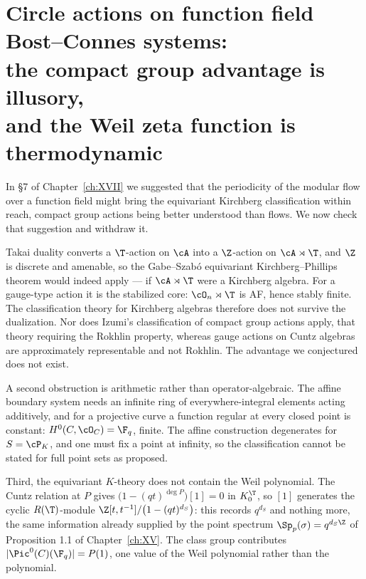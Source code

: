 \chapter[The compact group advantage is illusory]{Circle actions on function field Bost--Connes systems:\\ the compact group advantage is illusory,\\ and the Weil zeta function is thermodynamic}\label{ch:XVIII}
\begin{summary}
In \S7 of Chapter~\ref{ch:XVII} we suggested that the periodicity of the modular flow over a function
field might bring the equivariant Kirchberg classification within reach, compact group actions
being better understood than flows. We now check that suggestion and withdraw it.

Takai duality converts a $\T$-action on $\cA$ into a $\Z$-action on $\cA\rtimes\T$, and $\Z$
is discrete and amenable, so the Gabe--Szab\'o equivariant Kirchberg--Phillips theorem would
indeed apply --- if $\cA\rtimes\T$ were a Kirchberg algebra. For a gauge-type action it is
the stabilized core: $\cO_n\rtimes\T$ is AF, hence stably finite. The classification theory
for Kirchberg algebras therefore does not survive the dualization. Nor does Izumi's
classification of compact group actions apply, that theory requiring the Rokhlin property,
whereas gauge actions on Cuntz algebras are approximately representable and not Rokhlin. The
advantage we conjectured does not exist.

A second obstruction is arithmetic rather than operator-algebraic. The affine boundary system
needs an infinite ring of everywhere-integral elements acting additively, and for a
projective curve a function regular at every closed point is constant:
$H^0(C,\cO_C)=\F_q$, finite. The affine construction
degenerates for $S=\cP_K$, and one must fix a point at infinity, so the classification cannot
be stated for full point sets as proposed.

Third, the equivariant $K$-theory does not contain the Weil polynomial. The Cuntz relation at
$P$ gives $\bigl(1-(qt)^{\deg P}\bigr)[1]=0$ in $K_0^\T$, so $[1]$ generates the cyclic
$R(\T)$-module $\Z[t,t^{-1}]/\bigl(1-(qt)^{d_S}\bigr)$: this records $q^{d_S}$ and nothing
more, the same information already supplied by the point spectrum
$\Sp_p(\sigma)=q^{d_S\Z}$ of Proposition 1.1 of Chapter~\ref{ch:XV}. The class group contributes
$|\Pic^0(C)(\F_q)|=P(1)$, one value of
the Weil polynomial rather than the polynomial.


\end{summary}
